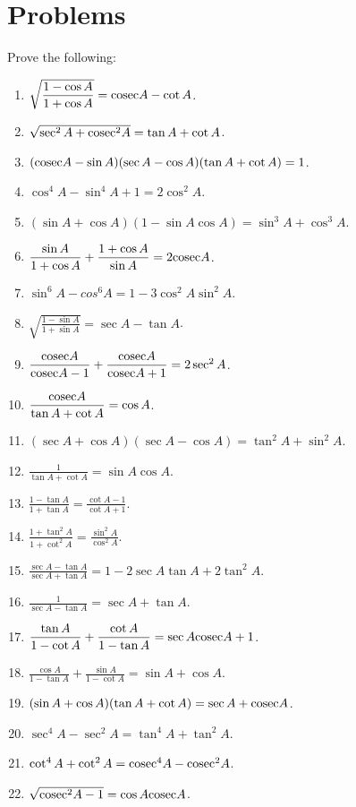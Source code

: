 \section{Problems}
Prove the following:

\begin{enumerate}
\item $\sqrt{\frac{1 - \cos A}{1 + \cos A}} = {\rm cosec} A - \cot A$.
\item $\sqrt{\sec^2A + {\rm cosec}^2A} = \tan A + \cot A$.
\item $({\rm cosec} A - \sin A)(\sec A - \cos A)(\tan A + \cot A) = 1$.
\item $\cos^4 A - \sin^4 A + 1 = 2\cos^2 A$.
\item $(\sin A + \cos A)(1 - \sin A\cos A) = \sin^3A + \cos^3A$.
\item $\frac{\sin A}{1 + \cos A}+\frac{1 + \cos A}{\sin A} = 2{\rm cosec} A$.
\item $\sin^6A - cos^6A = 1 - 3\cos^2A\sin^2A$.
\item $\sqrt{\frac{1 - \sin A}{1 + \sin A}} = \sec A - \tan A$.
\item $\frac{{\rm cosec} A}{{\rm cosec} A - 1} + \frac{{\rm cosec} A}{{\rm cosec} A + 1} = 2\sec^2 A$.
\item $\frac{{\rm cosec} A}{\tan A + \cot A} = \cos A$.
\item $(\sec A + \cos A)(\sec A - \cos A) = \tan^2 A + \sin^2A$.
\item $\frac{1}{\tan A + \cot A} = \sin A\cos A$.
\item $\frac{1 - \tan A}{1 + \tan A} = \frac{\cot A - 1}{\cot A + 1}$.
\item $\frac{1 + \tan^2A}{1 + \cot^2A} = \frac{\sin^2A}{\cos^2A}$.
\item $\frac{\sec A - \tan A}{\sec A + \tan A} = 1 - 2\sec A\tan A + 2\tan^2 A$.
\item $\frac{1}{\sec A - \tan A} = \sec A + \tan A$.
\item $\frac{\tan A}{1 - \cot A} + \frac{\cot A}{1 - \tan A} = \sec A{\rm cosec} A+ 1$.
\item $\frac{\cos A}{1 - \tan A} + \frac{\sin A}{1 - \cot A} = \sin A + \cos A$.
\item $(\sin A + \cos A)(\tan A + \cot A) = \sec A + {\rm cosec} A$.
\item $\sec^4A - \sec^2A = \tan^4A + \tan^2A$.
\item $\cot^4A + \cot^2A = {\rm cosec}^4A - {\rm cosec}^2A$.
\item $\sqrt{{\rm cosec}^2A - 1} = \cos A{\rm cosec} A$.

\end{enumerate}
